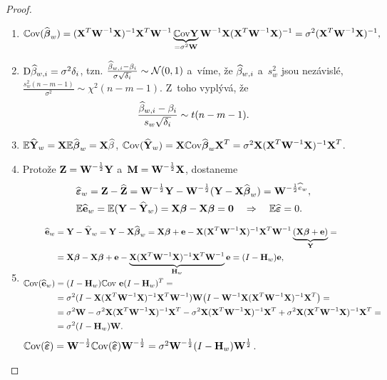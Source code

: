 \begin{theorem}
\begin{proof}
	\begin{enumerate}[1)]
		\item $$ \mathbb{C}\mathrm{ov} (\widehat{\boldsymbol{\beta}}_w) = {(\textbf{X}^T{\textbf{W}^{-1}}\textbf{X})^{-1}}\textbf{X}^T{\textbf{W}^{-1}}\underbrace{\mathbb{C}\mathrm{ov} \textbf{Y}}_{ = \sigma^2\textbf{W}}{\textbf{W}^{-1}}\textbf{X}{(\textbf{X}^T{\textbf{W}^{-1}}\textbf{X})^{-1}} = \sigma^2{(\textbf{X}^T{\textbf{W}^{-1}}\textbf{X})^{-1}}, $$
		\item $\mathrm{D} \widehat{\beta}_{w,i} = \sigma^2\delta_i$, tzn. $\frac{\widehat{\beta}_{w,i}-\beta_i}{\sigma\sqrt{\delta_i}}\sim\mathcal{N}(0,1)$ a~víme, že $\widehat{\beta}_{w,i}$ a~$s_w^2$ jsou nezávislé, $\frac{s_w^2(n-m-1)}{\sigma^2}\sim\chi^2(n-m-1)$. Z~toho vyplývá, že
		 $$ \frac{\widehat{\beta}_{w,i}-\beta_i}{s_w\sqrt{\delta_i}}\sim t(n-m-1). $$
		\item $\mathbb{E} \widehat{\textbf{Y}}_w = \textbf{X}\mathbb{E} \widehat{\boldsymbol{\beta}}_w = \textbf{X}\widehat{\beta}$, $\mathbb{C}\mathrm{ov}(\widehat{\textbf{Y}}_w) = \textbf{X}\mathbb{C}\mathrm{ov}\widehat{\boldsymbol{\beta}}_w \textbf{X}^T = \sigma^2\textbf{X}{(\textbf{X}^T{\textbf{W}^{-1}}\textbf{X})^{-1}}\textbf{X}^T$.
		\item Protože $\textbf{Z} = \textbf{W}^{-\frac{1}{2}}\textbf{Y}$ a~$\textbf{M} = \textbf{W}^{-\frac{1}{2}}\textbf{X}$, dostaneme
		\[
		\begin{split}
		& \widehat{\boldsymbol{\varepsilon}}_w = \textbf{Z}-\widehat{\textbf{Z}} = \textbf{W}^{-\frac{1}{2}}\textbf{Y}-\textbf{W}^{-\frac{1}{2}}(\textbf{Y}-\textbf{X}\widehat{\boldsymbol{\beta}}_w) = \textbf{W}^{-\frac{1}{2}\widehat{e}_w},\\
		& \mathbb{E} \widehat{\textbf{e}}_w = \mathbb{E}(\textbf{Y}-\widehat{\textbf{Y}}_w) = \textbf{X}\boldsymbol{\beta}-\textbf{X}\boldsymbol{\beta} = \textbf{0}\quad\Rightarrow\quad \mathbb{E} \widehat{\boldsymbol{\varepsilon}} = 0.
		\end{split}
		\]
		\item \[
		\begin{split}
		\widehat{\textbf{e}}_w& = \textbf{Y}-\widehat{\textbf{Y}}_w = \textbf{Y}-\textbf{X}\widehat{\boldsymbol{\beta}}_w = \textbf{X}\boldsymbol{\beta}+\textbf{e}-\textbf{X}{(\textbf{X}^T{\textbf{W}^{-1}}\textbf{X})^{-1}}\textbf{X}^T{\textbf{W}^{-1}}\underbrace{(\textbf{X}\boldsymbol{\beta}+\textbf{e})}_{\textbf{Y}} = \\& = \textbf{X}\boldsymbol{\beta}-\textbf{X}\boldsymbol{\beta}+\textbf{e}-\underbrace{\textbf{X}{(\textbf{X}^T{\textbf{W}^{-1}}\textbf{X})^{-1}}\textbf{X}^T{\textbf{W}^{-1}}}_{\textbf{H}_w}\textbf{e} = (I-\textbf{H}_w)\textbf{e},\\
		\mathbb{C}\mathrm{ov}(\widehat{\textbf{e}}_w)& = (I-\textbf{H}_w)\mathbb{C}\mathrm{ov}~\textbf{e}(I-\textbf{H}_w)^T = \\& = \sigma^2(I-\textbf{X}{(\textbf{X}^T{\textbf{W}^{-1}}\textbf{X})^{-1}}\textbf{X}^T{\textbf{W}^{-1}})\textbf{W}\big(I-{\textbf{W}^{-1}}\textbf{X}{(\textbf{X}^T{\textbf{W}^{-1}}\textbf{X})^{-1}}\textbf{X}^T\big) = \\& = \sigma^2\textbf{W}-\sigma^2\textbf{X}{(\textbf{X}^T{\textbf{W}^{-1}}\textbf{X})^{-1}}\textbf{X}^T-\sigma^2\textbf{X}{(\textbf{X}^T{\textbf{W}^{-1}}\textbf{X})^{-1}}\textbf{X}^T
+\sigma^2\textbf{X}{(\textbf{X}^T{\textbf{W}^{-1}}\textbf{X})^{-1}}\textbf{X}^T = \\& = \sigma^2(I-\textbf{H}_w)\textbf{W}.	\end{split}
		\]
		 $\mathbb{C}\mathrm{ov}(\widehat{\boldsymbol{\varepsilon}}) = \textbf{W}^{-\frac{1}{2}}\mathbb{C}\mathrm{ov}(\widehat{\boldsymbol{\varepsilon}})\textbf{W}^{-\frac{1}{2}} = \sigma^2\textbf{W}^{-\frac{1}{2}}(I-\textbf{H}_w)\textbf{W}^{\frac{1}{2}}$.
	\end{enumerate}
\end{proof}
\end{theorem}
